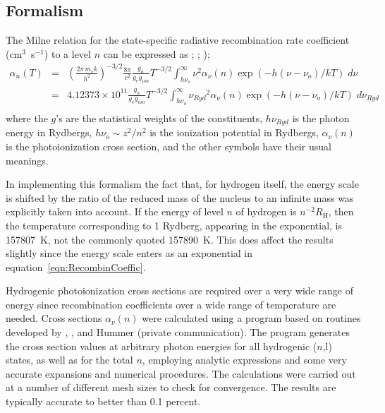 \subsection{Formalism}

The Milne relation for the state-specific radiative recombination rate
coefficient (cm$^3$~s$^{-1}$) to a level $n$ can be expressed as
\citep{Brown1970}; \citealp{Gould1978}; \citealp{Mihalas1978});
\begin{equation}
\label{eqn:RecombinCoeffic}
\begin{array}{ccl}
 {\alpha _n}\left( T \right)& =& {\left( {\frac{{2\pi \,{m_e}k}}{{{h^2}}}}
\right)^{ - 3/2}}\frac{{8\pi }}{{{c^2}}}\frac{{{g_n}}}{{{g_e}{g_{ion}}}}{T^{
- 3/2}}\int_{h{\nu _o}}^\infty  {{\nu ^2}{\alpha _\nu }\left( n \right)}
\exp \left( { - h\left( {\nu  - {\nu _o}} \right)/kT} \right)\;d\nu  \\
&  =& 4.12373 \times {10^{11}}\frac{{{g_n}}}{{{g_e}{g_{ion}}}}{T^{ -
3/2}}\int_{h{\nu _o}}^\infty  {{\nu _{Ryd}}^2{\alpha _\nu }\left( n \right)}
\exp \left( { - h\left( {\nu  - {\nu _o}} \right)/kT} \right)\;d{\nu _{Ryd}}
\\
 \end{array}
\end{equation}
where the $g$'s are the statistical weights of the constituents,
$h\nu_{Ryd}$ is the photon energy in Rydbergs,
$h\nu_o \sim z^2/n^2$ is the ionization potential in Rydbergs,
$\alpha_\nu(n)$ is the photoionization cross section,
and the other symbols have their usual meanings.

In implementing this formalism the fact that, for hydrogen itself, the
energy scale is shifted by the ratio of the reduced mass of the nucleus
to an infinite mass was explicitly taken into account.  If the energy of
level $n$ of hydrogen is $n^{-2} R_{\mathrm{H}}$,
then the temperature corresponding to 1 Rydberg,
appearing in the exponential, is 157807~K,
not the commonly quoted 157890~K.
This does affect the results slightly since the energy scale
enters as an exponential in equation~\ref{eqn:RecombinCoeffic}.

Hydrogenic photoionization cross sections are required over a very wide
range of energy since recombination coefficients over a wide range of
temperature are needed.
Cross sections $\alpha_\nu(n)$ were calculated using a program
based on routines developed by \cite{Hummer1988},
\cite{Storey1991}, and Hummer (private communication).
The program generates the cross section values
at arbitrary photon energies for all hydrogenic ($n$,l) states, as well as
for the total $n$, employing analytic expressions and some very accurate
expansions and numerical procedures.  The calculations were carried out
at a number of different mesh sizes to check for convergence.  The results
are typically accurate to better than 0.1 percent.


